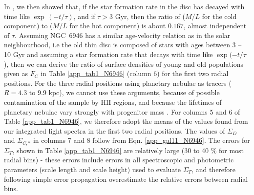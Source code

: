 \documentclass[fleqn,usenatbib]{mnras}
\begin{document}
In , we then showed that, if the star formation rate in the disc has decayed with time like $\exp\,(-t/\tau)$, and if $\tau > 3$ Gyr, then the ratio of  ($M/L$ for the cold component) to ($M/L$ for the hot component) is about $0.167$, almost independent of $\tau$.
Assuming NGC~6946 has a similar age-velocity relation as in the solar neighbourhood, i.e the old thin disc is composed of stars with ages between 3 -- 10 Gyr and assuming a star formation rate that decays with time like $\exp(-t/\tau$), then we can derive the ratio of surface densities of young and old populations given as $F_C$ in Table \ref{app_tab1_N6946} (column 6) for the first two radial positions.  For the three radial positions using planetary nebulae as tracers ($R = 4.3$ to $9.9$ kpc), we cannot use these arguments, because of possible contamination of the sample by HII regions, and because the lifetimes of planetary nebulae vary strongly with progenitor mass \citep{miller16}. For columns 5 and 6 of Table \ref{app_tab1_N6946}, we therefore adopt the means of the values found from our integrated light spectra in the first two radial positions. The values of $\Sigma_D$ and $\Sigma_{C,*}$ in columns 7 and 8 follow from Eqn. \ref{app_gal11_N6946}. The errors for $\Sigma_T$, shown in Table \ref{app_tab1_N6946} are relatively large (30 to 40 \% for most radial bins) - these errors include errors in all spectroscopic and photometric parameters (scale length and scale height) used to evaluate $\Sigma_T$, and therefore following simple error propagation overestimate the relative errors between radial bins.
\end{document}
